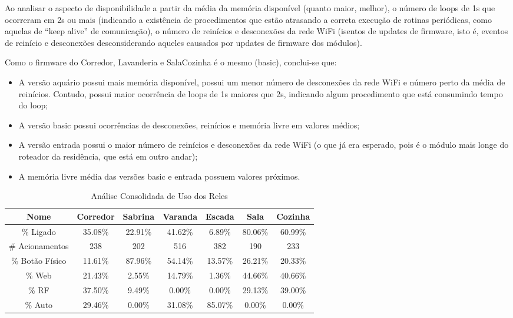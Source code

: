 Ao analisar o aspecto de disponibilidade a partir da média da memória disponível (quanto maior, melhor), o número de loops de 1s que ocorreram em 2s ou mais (indicando a existência de procedimentos que estão atrasando a correta execução de rotinas periódicas, como aquelas de “keep alive” de comunicação), o número de reinícios e desconexões da rede WiFi (isentos de updates de firmware, isto é, eventos de reinício e desconexões desconsiderando aqueles causados por updates de firmware dos módulos).

Como o firmware do Corredor, Lavanderia e SalaCozinha é o mesmo (basic), conclui-se que:

\begin{itemize}
	\item A versão aquário possui mais memória disponível, possui um menor número de desconexões da rede WiFi e número perto da média de reinícios. Contudo, possui maior ocorrência de loops de 1s maiores que 2s, indicando algum procedimento que está consumindo tempo do loop;
	\item A versão basic possui ocorrências de desconexões, reinícios e memória livre em valores médios;
	\item A versão entrada possui o maior número de reinícios e desconexões da rede WiFi (o que já era esperado, pois é o módulo mais longe do roteador da residência, que está em outro andar);
	\item A memória livre média das versões basic e entrada possuem valores próximos.
\end{itemize}

\begin{table}[H]
	\caption{Análise Consolidada de Uso dos Reles}
	\setlength\tabcolsep{1.5pt}
	\centering
	\footnotesize
	\begin{tabular}{ccccccc}
		\textbf{Nome} &
		\textbf{Corredor} &
		\textbf{Sabrina} &
		\textbf{Varanda} &
		\textbf{Escada} &
		\textbf{Sala} &
		\textbf{Cozinha} \\
		\midrule
		\% Ligado &
		35.08\% &
		22.91\% &
		41.62\% &
		6.89\% &
		80.06\% &
		60.99\% \\
		\# Acionamentos &
		238 &
		202 &
		516 &
		382 &
		190 &
		233 \\
		\% Botão Físico &
		11.61\% &
		87.96\% &
		54.14\% &
		13.57\% &
		26.21\% &
		20.33\% \\
		\% Web &
		21.43\% &
		2.55\% &
		14.79\% &
		1.36\% &
		44.66\% &
		40.66\% \\
		\% RF &
		37.50\% &
		9.49\% &
		0.00\% &
		0.00\% &
		29.13\% &
		39.00\% \\
		\% Auto &
		29.46\% &
		0.00\% &
		31.08\% &
		85.07\% &
		0.00\% &
		0.00\% \\
	\end{tabular}
\end{table}

